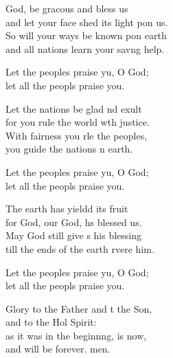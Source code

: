 \settowidth{\versewidth}{and let your face shed its light upon us.}
\begin{psalmverse}%
  \begin{patverse}
 God, be grac\pointup{\i}ous and bless us\Med\\
and let your face shed its light pon us.\\
So will your ways be known pon earth\Med\\
and all nations learn your sav\pointup{\i}ng help.

Let the peoples praise yu, O God;\Med\\
let all the peopls praise you.

Let the nations be glad nd exult\Med\\
for you rule the world w\pointup{\i}th justice.\\
With fairness you rle the peoples,\Med\\
you guide the nations n earth.

Let the peoples praise yu, O God;\Med\\
let all the peopls praise you.

The earth has yieldd its fruit\Med\\
for God, our God, hs blessed us.\\
May God still give s his blessing\Med\\
till the ends of the earth rvere him.

Let the peoples praise yu, O God;\Med\\
let all the peopls praise you.

Glory to the Father and t the Son,\Med\\
and to the Hol Spirit:\\
as it was in the beginn\pointup{\i}ng, is now,\Med\\
and will be forever. men.
  \end{patverse}
\end{psalmverse}
